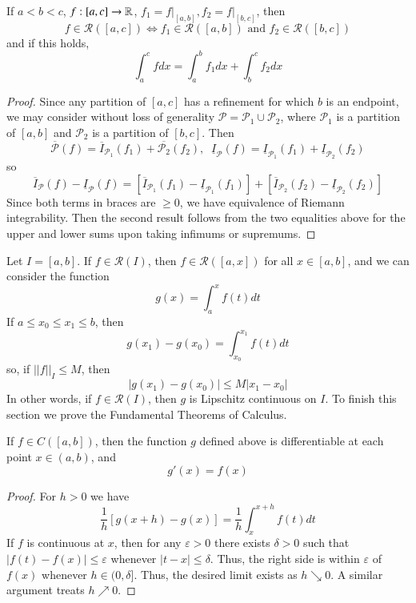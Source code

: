 \begin{prop}
    If $a < b < c$, $f: [a,c]\rightarrow \mathbb R$, $f_1 = f\vert_{[a,b]}, f_2 = f\vert_{[b,c]}$, then $$f \in \mathcal{R}([a,c]) \iff f_1 \in \mathcal{R}([a,b])\text{ and }f_2 \in \mathcal{R}([b,c])$$
    and if this holds, $$\int_a^cfdx = \int_a^bf_1dx + \int_b^cf_2dx$$
\end{prop}
\begin{proof}
    Since any partition of $[a,c]$ has a refinement for which $b$ is an endpoint, we may consider without loss of generality $\mathcal{P} = \mathcal{P}_1\cup\mathcal{P}_2$, where $\mathcal{P}_1$ is a partition of $[a,b]$ and $\mathcal{P}_2$ is a partition of $[b,c]$. Then $$\overline{\mathcal{P}}(f) = \overline{I}_{\mathcal{P}_1}(f_1) + \overline{\mathcal{P}_2}(f_2),\;\;\underline{I}_{\mathcal{P}}(f) = \underline{I}_{\mathcal{P}_1}(f_1)+\underline{I}_{\mathcal{P}_2}(f_2)$$
    so $$\overline{I}_{\mathcal{P}}(f) - \underline{I}_{\mathcal{P}}(f) = [\overline{I}_{\mathcal{P}_1}(f_1) - \underline{I}_{\mathcal{P}_1}(f_1)] +  [\overline{I}_{\mathcal{P}_2}(f_2) - \underline{I}_{\mathcal{P}_2}(f_2)]$$ 
    Since both terms in braces are $\geq 0$, we have equivalence of Riemann integrability. Then the second result follows from the two equalities above for the upper and lower sums upon taking infimums or supremums.
\end{proof}

Let $I = [a,b]$. If $f \in \mathcal{R}(I)$, then $f \in \mathcal{R}([a,x])$ for all $x \in [a,b]$, and we can consider the function $$g(x) = \int_a^xf(t)dt$$ 
If $a \leq x_0 \leq x_1 \leq b$, then $$g(x_1) - g(x_0) = \int_{x_0}^{x_1}f(t)dt$$
so, if $||f||_I \leq M$, then $$|g(x_1)-g(x_0)| \leq M|x_1-x_0|$$
In other words, if $f \in \mathcal{R}(I)$, then $g$ is Lipschitz continuous on $I$. To finish this section we prove the Fundamental Theorems of Calculus.

\begin{thm}
    If $f \in C([a,b])$, then the function $g$ defined above is differentiable at each point $x \in (a,b)$, and $$g'(x) = f(x)$$
\end{thm}
\begin{proof}
    For $h > 0$ we have $$\frac{1}{h}[g(x+h) - g(x)] = \frac{1}{h}\int_x^{x+h}f(t)dt$$
    If $f$ is continuous at $x$, then for any $\varepsilon > 0$ there exists $\delta > 0$ such that $|f(t) - f(x)| \leq \varepsilon$ whenever $|t-x| \leq \delta$. Thus, the right side is within $\varepsilon$ of $f(x)$ whenever $h \in (0,\delta]$. Thus, the desired limit exists as $h\searrow 0$. A similar argument treats $h\nearrow 0$.
\end{proof}

